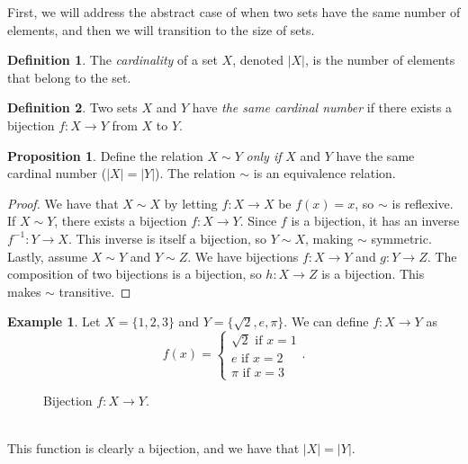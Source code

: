 \documentclass{article}
\theoremstyle{definition}
\newtheorem{proposition}{Proposition}[section]
\newtheorem{definition}{Definition}[section]
\newtheorem{example}{Example}[section]
\begin{document}
	First, we will address the abstract case of when two sets have the same number of elements, and then we will transition to the size of sets.
	\begin{definition}\label{def}
		The \textit{\color{red}cardinality} of a set $ X $, denoted $ |X| $, is the number of elements that belong to the set.   
	\end{definition} 
	\begin{definition}\label{def}
		Two sets $ X $ and $ Y $ have \textit{\color{red}the same cardinal number} if there exists a bijection $ f:X\to Y $ from $ X $ to $ Y $.  
	\end{definition} 
	\begin{proposition}
		Define the relation $ X\sim Y $ \textit{only if} $ X $ and $ Y $ have the same cardinal number ($ |X|=|Y| $). The relation $ \sim $ is an equivalence relation. 
	\end{proposition} 
	\begin{proof}
		We have that $ X\sim X $ by letting $ f:X\to X $ be $ f(x)=x $, so $ \sim $ is reflexive. If $ X\sim Y $, there exists a bijection $ f:X\to Y $. Since $ f $ is a bijection, it has an inverse $ f^{-1}:Y\to X $. This inverse is itself a bijection, so $ Y\sim X $, making $ \sim $ symmetric. Lastly, assume $ X\sim Y $ and $ Y\sim Z $. We have bijections $ f:X\to Y $ and $ g:Y\to Z $. The composition of two bijections is a bijection, so $ h:X\to Z $ is a bijection. This makes $ \sim $ transitive.  
	\end{proof}
	\begin{example}
		Let $ X=\{1,2,3\} $ and $ Y=\{\sqrt{2},e,\pi\} $. We can define $ f:X\to Y $ as $$ f(x)=\begin{cases}
			\sqrt{2}\text{ if }x=1\\e\text{ if }x=2\\\pi\text{ if }x=3
		\end{cases}.$$
		\begin{figure}[h!]
			\centering
			\caption{Bijection $ f:X\to Y $.}
		\end{figure}  \\
		This function is clearly a bijection, and we have that $ |X|=|Y| $.
	\end{example} 
\end{document}
